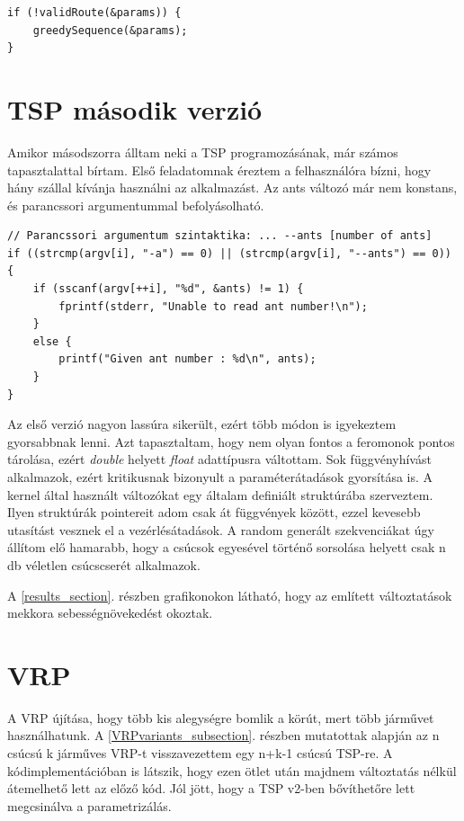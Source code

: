 \begin{lstlisting}[style=CStyle,showstringspaces=false]
if (!validRoute(&params)) {
	greedySequence(&params);
}
\end{lstlisting}

\section{TSP második verzió}
Amikor másodszorra álltam neki a TSP programozásának, már számos tapasztalattal bírtam. Első feladatomnak éreztem a felhasználóra bízni, hogy hány szállal kívánja használni az alkalmazást. Az ants változó már nem konstans, és parancssori argumentummal befolyásolható.

\begin{lstlisting}[style=CStyle,showstringspaces=false]
// Parancssori argumentum szintaktika: ... --ants [number of ants]
if ((strcmp(argv[i], "-a") == 0) || (strcmp(argv[i], "--ants") == 0))
{
	if (sscanf(argv[++i], "%d", &ants) != 1) {
		fprintf(stderr, "Unable to read ant number!\n");
	}
	else {
		printf("Given ant number : %d\n", ants);
	}
}
\end{lstlisting}

 Az első verzió nagyon lassúra sikerült, ezért több módon is igyekeztem gyorsabbnak lenni. Azt tapasztaltam, hogy nem olyan fontos a feromonok pontos tárolása, ezért \textit{double} helyett \textit{float} adattípusra váltottam. 
 Sok függvényhívást alkalmazok, ezért kritikusnak bizonyult a paraméterátadások gyorsítása is. A kernel által használt változókat egy általam definiált struktúrába szerveztem. Ilyen struktúrák pointereit adom csak át függvények között, ezzel kevesebb utasítást vesznek el a vezérlésátadások. A random generált szekvenciákat úgy állítom elő hamarabb, hogy a csúcsok egyesével történő sorsolása helyett csak n db véletlen csúcscserét alkalmazok. 
 
 A \ref{results_section}. részben grafikonokon látható, hogy az említett változtatások mekkora sebességnövekedést okoztak.

\section{VRP}

A VRP újítása, hogy több kis alegységre bomlik a körút, mert több járművet használhatunk. A \ref{VRPvariants_subsection}. részben mutatottak alapján az n csúcsú k járműves VRP-t visszavezettem egy n+k-1 csúcsú TSP-re. A kódimplementációban is látszik, hogy ezen ötlet után majdnem változtatás nélkül átemelhető lett az előző kód. Jól jött, hogy a TSP v2-ben bővíthetőre lett megcsinálva a parametrizálás.

